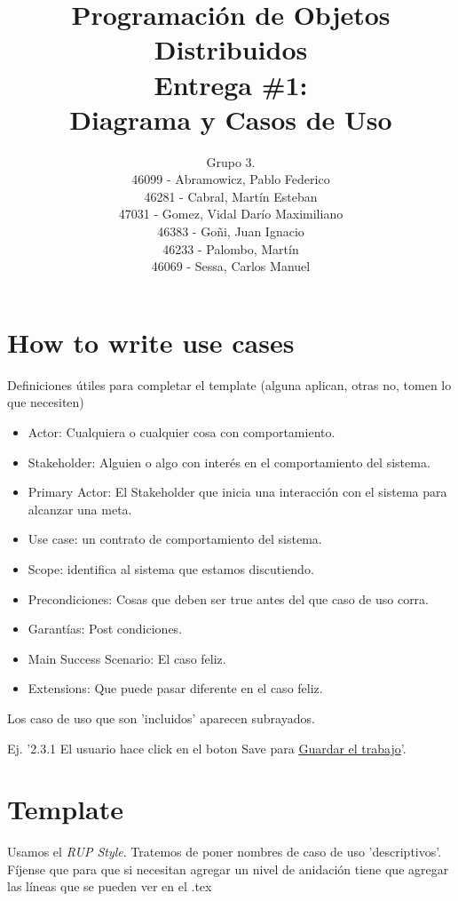\documentclass[a4paper,11pt]{article}
\title{
        Programación de Objetos Distribuidos \\
        Entrega \#1: \\
        Diagrama y Casos de Uso
    }
\author{
        Grupo 3. \\
        46099 - Abramowicz, Pablo Federico \\
        46281 - Cabral, Martín Esteban \\
        47031 - Gomez, Vidal Darío Maximiliano \\
        46383 - Goñi, Juan Ignacio \\
        46233 - Palombo, Martín \\
        46069 - Sessa, Carlos Manuel
        }
\date{}
\begin{document}
\maketitle
\pagebreak
\section{How to write use cases}

Definiciones útiles para completar el template
(alguna aplican, otras no, tomen lo que necesiten)

\begin{itemize}
 \item Actor: Cualquiera o cualquier cosa con comportamiento.
 \item Stakeholder: Alguien o algo con interés en el comportamiento del sistema.
 \item Primary Actor: El Stakeholder que inicia una interacción con el sistema para alcanzar una meta.
 \item Use case: un contrato de comportamiento del sistema.
 \item Scope: identifica al sistema que estamos discutiendo.
 \item Precondiciones: Cosas que deben ser true antes del que caso de uso corra.
 \item Garantías: Post condiciones.
 \item Main Success Scenario: El caso feliz.
 \item Extensions: Que puede pasar diferente en el caso feliz.
\end{itemize}

Los caso de uso que son 'incluidos' aparecen subrayados.

Ej. '2.3.1 El usuario hace click en el boton Save para \underline{Guardar el trabajo}'.

\pagebreak
\section{Template}
Usamos el \emph{RUP Style}. Tratemos de poner nombres de caso de uso 'descriptivos'.
Fíjense que para que si necesitan agregar un nivel de anidación tiene que agregar
las líneas que se pueden ver en el .tex

\renewcommand{\theenumi}{\arabic{enumi}.}
\renewcommand{\labelenumi}{\theenumi}
 
\renewcommand{\theenumii}{\arabic{enumii}.}
\renewcommand{\labelenumii}{\theenumii}
\end{document}
